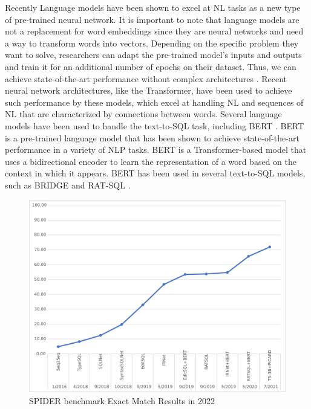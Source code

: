 Recently Language models have been shown to excel at NL tasks as a new type of pre-trained neural network. It is important to note that language models are not a replacement for word embeddings since they are neural networks and need a way to transform words into vectors.
Depending on the specific problem they want to solve, researchers can adapt the pre-trained model's inputs and outputs and train it for an additional number of epochs on their dataset. Thus, we can achieve state-of-the-art performance without complex architectures \cite{DBLP:journals/corr/abs-1810-04805}. Recent neural network architectures, like the Transformer\cite{DBLP:journals/corr/VaswaniSPUJGKP17}, have been used to achieve such performance by these models, which excel at handling NL and sequences of NL that are characterized by connections between words. Several language models have been used to handle the text-to-SQL task, including BERT \cite{DBLP:journals/corr/abs-1810-04805}. BERT is a pre-trained language model that has been shown to achieve state-of-the-art performance in a variety of NLP tasks. BERT is a Transformer-based model that uses a bidirectional encoder to learn the representation of a word based on the context in which it appears. BERT has been used in several text-to-SQL models, such as BRIDGE \cite{lin_bridging_2020} and RAT-SQL \cite{wang_rat-sql_2021}.


\begin{figure}[h]
    \centering
    \includegraphics[width=0.99\linewidth]{pics/benchmarkeps}
    \caption{SPIDER benchmark Exact Match Results in 2022}
    \label{fig:benchmark}
\end{figure}

% 
% 
% 
% 
% 
% 
% 
% 

